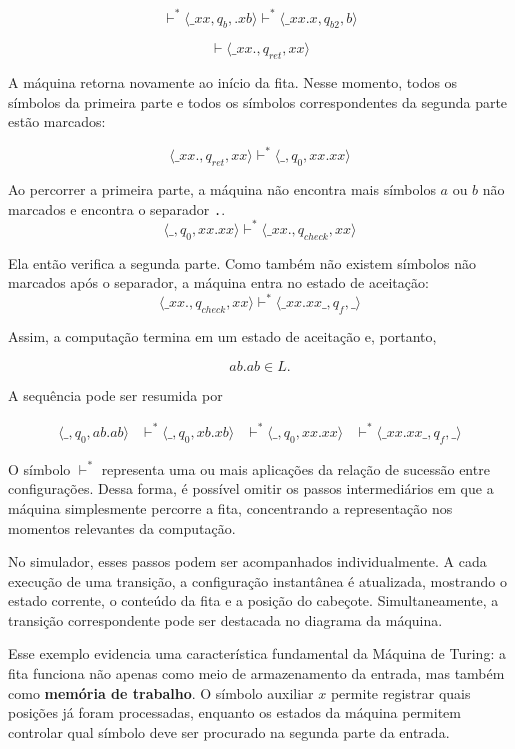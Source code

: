 \documentclass[
  brazilian,
  letterpaper,
]{book}
\theoremstyle{plain}
\theoremstyle{definition}
\theoremstyle{remark}
\begin{document}
\[
\vdash^*
\langle\_xx,q_b,.xb\rangle
\vdash^*
\langle\_xx.x,q_{b2},b\rangle
\]

\[
\vdash
\langle\_xx.,q_{ret},xx\rangle
\]

A máquina retorna novamente ao início da fita. Nesse momento, todos os
símbolos da primeira parte e todos os símbolos correspondentes da
segunda parte estão marcados:

\[
\langle\_xx.,q_{ret},xx\rangle
\vdash^*
\langle\_,q_0,xx.xx\rangle
\]

Ao percorrer a primeira parte, a máquina não encontra mais símbolos
\(a\) ou \(b\) não marcados e encontra o separador \texttt{.}. \[
\langle\_,q_0,xx.xx\rangle
\vdash^*
\langle\_xx.,q_{check},xx\rangle
\]

Ela então verifica a segunda parte. Como também não existem símbolos não
marcados após o separador, a máquina entra no estado de aceitação: \[
\langle\_xx.,q_{check},xx\rangle
\vdash^*
\langle\_xx.xx\_,q_{f},\_\rangle
\]

Assim, a computação termina em um estado de aceitação e, portanto,

\[
ab.ab\in L.
\]

A sequência pode ser resumida por

\[
\begin{aligned}
\langle\_,q_0,ab.ab\rangle
&\vdash^*
\langle\_,q_0,xb.xb\rangle
&\vdash^*
\langle\_,q_0,xx.xx\rangle
&\vdash^*
\langle\_xx.xx\_,q_{f},\_\rangle
\end{aligned}
\]

O símbolo \(\vdash^*\) representa uma ou mais aplicações da relação de
sucessão entre configurações. Dessa forma, é possível omitir os passos
intermediários em que a máquina simplesmente percorre a fita,
concentrando a representação nos momentos relevantes da computação.

No simulador, esses passos podem ser acompanhados individualmente. A
cada execução de uma transição, a configuração instantânea é atualizada,
mostrando o estado corrente, o conteúdo da fita e a posição do cabeçote.
Simultaneamente, a transição correspondente pode ser destacada no
diagrama da máquina.

Esse exemplo evidencia uma característica fundamental da Máquina de
Turing: a fita funciona não apenas como meio de armazenamento da
entrada, mas também como \textbf{memória de trabalho}. O símbolo
auxiliar \(x\) permite registrar quais posições já foram processadas,
enquanto os estados da máquina permitem controlar qual símbolo deve ser
procurado na segunda parte da entrada.
\end{document}
